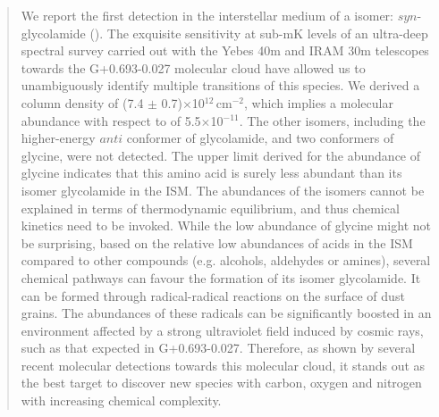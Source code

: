\documentclass[twocolumn]{aastex63}
\begin{document}
\begin{abstract}
We report the first detection in the interstellar medium of a  isomer: $syn$-glycolamide (). The exquisite sensitivity at sub-mK levels of an ultra-deep spectral survey carried out with the Yebes 40m and IRAM 30m telescopes towards the G+0.693-0.027 molecular cloud have allowed us to unambiguously identify multiple transitions of this species.
We derived a column density of (7.4 $\pm$ 0.7)$\times$10$^{12}$\,cm$^{-2}$, which implies a molecular abundance with respect to  of 5.5$\times$10$^{-11}$. The other  isomers, including the higher-energy $anti$ conformer of glycolamide, and two conformers of glycine, were not detected. The upper limit derived for the abundance of glycine indicates that this amino acid is surely less abundant than its isomer glycolamide in the ISM. The abundances of the  isomers cannot be explained in terms of thermodynamic equilibrium, and thus chemical kinetics need to be invoked. While the low abundance of glycine might not be surprising, based on the relative low abundances of acids in the ISM compared to other compounds (e.g. alcohols, aldehydes or amines), several chemical pathways can favour the formation of its isomer glycolamide. 
It can be formed through radical-radical reactions on the surface of dust grains. The abundances of these radicals can be significantly boosted in an environment affected by a strong ultraviolet field induced by cosmic rays, such as that expected in G+0.693-0.027. Therefore, as shown by several recent molecular detections towards this molecular cloud, it stands out as the best target to discover new species with carbon, oxygen and nitrogen with increasing chemical complexity.

\end{abstract}



\end{document}
